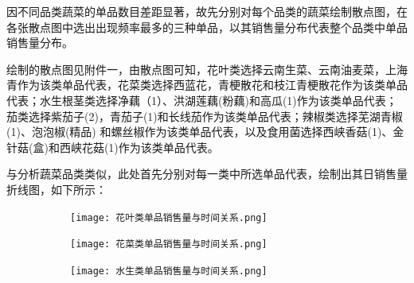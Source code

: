 \documentclass{my_paper}
\begin{document}
因不同品类蔬菜的单品数目差距显著，故先分别对每个品类的蔬菜绘制散点图，在各张散点图中选出出现频率最多的三种单品，以其销售量分布代表整个品类中单品销售量分布。\par
绘制的散点图见附件一，由散点图可知，花叶类选择云南生菜、云南油麦菜，上海青作为该类单品代表，花菜类选择西蓝花，青梗散花和枝江青梗散花作为该类单品代表；水生根茎类选择净藕（1）、洪湖莲藕(粉藕)和高瓜(1)作为该类单品代表；茄类选择紫茄子(2)，青茄子(1)和长线茄作为该类单品代表；辣椒类选择芜湖青椒(1)、泡泡椒(精品) 和螺丝椒作为该类单品代表，以及食用菌选择西峡香菇(1)、金针菇(盒)和西峡花菇(1)作为该类单品代表。\par
与分析蔬菜品类类似，此处首先分别对每一类中所选单品代表，绘制出其日销售量折线图，如下所示：
\begin{figure}[H]
    \centering
    \begin{subfigure}{0.3\textwidth}
        \texttt{[image: 花叶类单品销售量与时间关系.png]}
        \caption{}
        \label{fig:sub1}
    \end{subfigure}%
    \hfill
    \begin{subfigure}{0.3\textwidth}
        \texttt{[image: 花菜类单品销售量与时间关系.png]}
        \caption{}
        \label{fig:sub2}
    \end{subfigure}%
    \hfill
    \begin{subfigure}{0.3\textwidth}
        \texttt{[image: 水生类单品销售量与时间关系.png]}
        \caption{}
        \label{fig:sub3}
    \end{subfigure}

    \vspace{1em} %


\end{figure}
\end{document}
